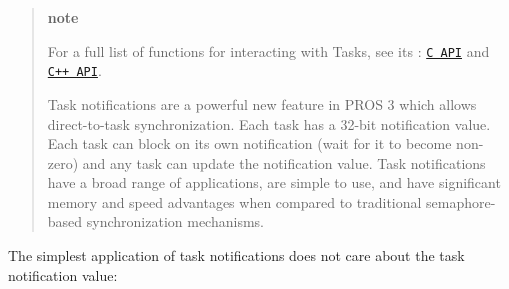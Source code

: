 \begin{quote}
{\bfseries note}

For a full list of functions for interacting with Tasks, see its \+: \href{../../api/c/rtos.html}{\tt C A\+PI} and \href{../../api/cpp/rtos.html}{\tt C++ A\+PI}.

Task notifications are a powerful new feature in P\+R\+OS 3 which allows direct-\/to-\/task synchronization. Each task has a 32-\/bit notification value. Each task can block on its own notification (wait for it to become non-\/zero) and any task can update the notification value. Task notifications have a broad range of applications, are simple to use, and have significant memory and speed advantages when compared to traditional semaphore-\/based synchronization mechanisms. \end{quote}


The simplest application of task notifications does not care about the task notification value\+: 